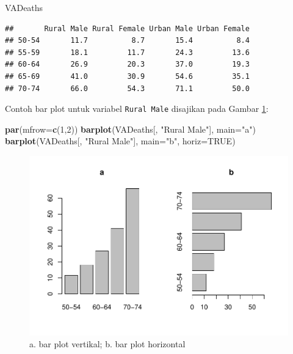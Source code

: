 \documentclass[]{book}
\newenvironment{Shaded}{\begin{snugshade}}{\end{snugshade}}
\newcommand{\KeywordTok}[1]{\textcolor[rgb]{0.13,0.29,0.53}{\textbf{#1}}}
\newcommand{\DataTypeTok}[1]{\textcolor[rgb]{0.13,0.29,0.53}{#1}}
\newcommand{\DecValTok}[1]{\textcolor[rgb]{0.00,0.00,0.81}{#1}}
\newcommand{\StringTok}[1]{\textcolor[rgb]{0.31,0.60,0.02}{#1}}
\newcommand{\OtherTok}[1]{\textcolor[rgb]{0.56,0.35,0.01}{#1}}
\newcommand{\NormalTok}[1]{#1}
\begin{document}
\begin{Shaded}
\begin{Highlighting}[]
\NormalTok{VADeaths}
\end{Highlighting}
\end{Shaded}

\begin{verbatim}
##       Rural Male Rural Female Urban Male Urban Female
## 50-54       11.7          8.7       15.4          8.4
## 55-59       18.1         11.7       24.3         13.6
## 60-64       26.9         20.3       37.0         19.3
## 65-69       41.0         30.9       54.6         35.1
## 70-74       66.0         54.3       71.1         50.0
\end{verbatim}

Contoh bar plot untuk variabel \texttt{Rural\ Male} disajikan pada
Gambar \ref{fig:barplot}:

\begin{Shaded}
\begin{Highlighting}[]
\KeywordTok{par}\NormalTok{(}\DataTypeTok{mfrow=}\KeywordTok{c}\NormalTok{(}\DecValTok{1}\NormalTok{,}\DecValTok{2}\NormalTok{))}
\KeywordTok{barplot}\NormalTok{(VADeaths[, }\StringTok{"Rural Male"}\NormalTok{], }\DataTypeTok{main=}\StringTok{"a"}\NormalTok{)}
\KeywordTok{barplot}\NormalTok{(VADeaths[, }\StringTok{"Rural Male"}\NormalTok{], }\DataTypeTok{main=}\StringTok{"b"}\NormalTok{, }\DataTypeTok{horiz=}\OtherTok{TRUE}\NormalTok{)}
\end{Highlighting}
\end{Shaded}

\begin{figure}

{\centering \includegraphics[width=0.7\linewidth]{EnvStat_files/figure-latex/barplot-1} 

}

\caption{a. bar plot vertikal; b. bar plot horizontal}\label{fig:barplot}
\end{figure}
\end{document}
